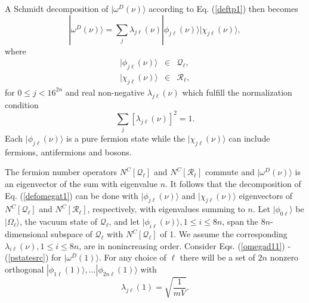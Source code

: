 \documentclass[12pt,amsmath,amssymb,onecolumn]{revtex4-2}
\begin{document}
A Schmidt decomposition of $|\omega^D(\nu) \rangle $ according to
Eq. (\ref{deftp1}) then becomes
\begin{equation}
\label{defomegat1}
|\omega^D(\nu) \rangle  =  \sum_j \lambda_{j\ell}(\nu) 
|\phi_{j\ell}(\nu) \rangle |\chi_{j\ell}(\nu) \rangle ,
\end{equation}
where 
\begin{subequations}
\begin{eqnarray}
\label{defphit3}
|\phi_{j\ell}(\nu) \rangle  & \in & \mathcal{Q}_\ell, \\
\label{defchit3}
|\chi_{j\ell}( \nu) \rangle  & \in & \mathcal{R}_\ell,
\end{eqnarray}
\end{subequations}
for $0 \leq j < 16^{2n}$ and real non-negative $\lambda_{j\ell}( \nu)$ which
fulfill the normalization condition
\begin{equation}
\label{normalization1}
\sum_j [ \lambda_{j\ell}( \nu)]^2 =  1.
\end{equation}
Each $|\phi_{j\ell}(\nu) \rangle $ is a pure fermion state while
the $|\chi_{j\ell}(\nu) \rangle $ can include fermions, antifermions and bosons.



The fermion number operators $N^C[\mathcal{Q}_\ell]$ and $N^C[\mathcal{R}_\ell]$ commute and
$|\omega^D(\nu) \rangle $ is an eigenvector of the sum with eigenvalue $n$. It follows that 
the decomposition of Eq. (\ref{defomegat1}) can be done with $|\phi_{j\ell}( \nu) \rangle $ 
and $|\chi_{j\ell}(\nu) \rangle $
eigenvectors of $N^C[\mathcal{Q}_\ell]$ and $N^C[\mathcal{R}_\ell]$, respectively, with
eigenvalues summing to $n$. Let $|\phi_{0\ell} \rangle $ be $|\Omega_\ell \rangle $, the vacuum state
of $\mathcal{Q}_\ell$, and let 
$|\phi_{i\ell} (\nu) \rangle , 1 \le i \le 8n$, 
span the $8n$-dimensional subspace of $\mathcal{Q}_\ell$
with $N^C[\mathcal{Q}_\ell]$ of 1. 
We assume the corresponding $\lambda_{i\ell}( \nu), 1 \le i \le 8n$,
are in nonincreasing order.
Consider Eqs. (\ref{omegad11}) - (\ref{pstatesrc}) for $|\omega^D(1) \rangle $. For any choice
of $\ell$ there will be a set of $2n$ nonzero orthogonal
$|\phi_{1\ell}( 1) \rangle , ... |\phi_{2n\ell}( 1) \rangle $ with 
\begin{equation}
\label{lambda4}
\lambda_{j\ell}( 1) = \sqrt{\frac{1}{mV}}.
\end{equation}
\end{document}
